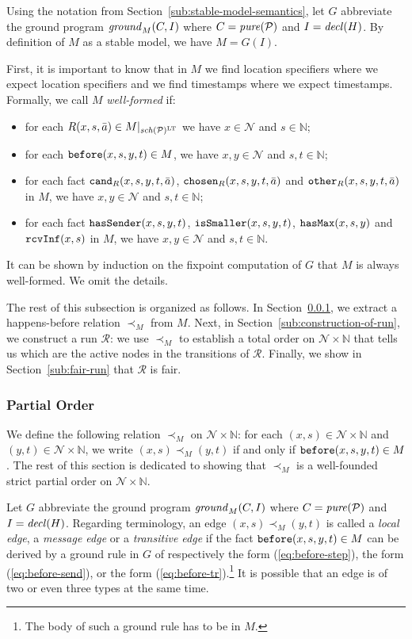 \documentclass{tlp}
\newcommand{\Nat}{\mathbb{N}}  \newcommand{\len}[1]{|#1|} \newcommand{\rom}[1]{\text{\emph{(#1)}}} \newcommand{\romI}{\rom i}
\newcommand{\ded}{\mathcal{P}}
\newcommand{\proj}[2]{#1|_{#2}}
\newcommand{\schof}[1]{\fname{sch}(#1)}
\newcommand{\grp}[3]{\fname{ground}_{#1}(#2,#3)}
\newcommand{\nw}{\mathcal{N}}
\newcommand{\toloct}[1]{#1^{\mathrm{LT}}}
\newcommand{\before}{\pred{before}}
\newcommand{\chosen}{\pred{chosen}}
\newcommand{\other}{\pred{other}}
\newcommand{\cand}{\pred{cand}}
\newcommand{\rcvinf}{\pred{rcvInf}}
\newcommand{\issmaller}{\pred{isSmaller}}
\newcommand{\hasmax}{\pred{hasMax}}
\newcommand{\hassender}{\pred{hasSender}}
\newcommand{\decl}[1]{\fname{decl}(#1)}
\newcommand{\pure}[1]{\fname{pure}(#1)}
\newcommand{\run}{\mathcal{R}}
\newcommand{\nwnat}{\nw\times\Nat}
\newcommand{\grded}{G}
\newcommand{\cauM}{\prec_{M}}
\begin{document}
Using the notation from Section~\ref{sub:stable-model-semantics},
let $\grded$ abbreviate the ground program $\grp MCI$ where $C=\pure{\ded}$
and $I=\decl H$. By definition of $M$ as a stable model, we have
$M=\grded(I)$. 

First, it is important to know that in $M$ we find location specifiers
where we expect location specifiers and we find timestamps where we
expect timestamps. Formally, we call $M$ \emph{well-formed} if:
\begin{itemize}
\item for each $R(x,s,\bar{a})\in\proj M{\toloct{\schof{\ded}}}$ we have
$x\in\nw$ and $s\in\Nat$;
\item for each $\before(x,s,y,t)\in M$, we have $x,y\in\nw$ and $s,t\in\Nat$;
\item for each fact $\cand_{R}(x,s,y,t,\bar{a})$, $\chosen_{R}(x,s,y,t,\bar{a})$
and $\other_{R}(x,s,y,t,\bar{a})$ in $M$, we have $x,y\in\nw$ and
$s,t\in\Nat$;
\item for each fact $\hassender(x,s,y,t)$, $\issmaller(x,s,y,t)$, $\hasmax(x,s,y)$
and $\rcvinf(x,s)$ in $M$, we have $x,y\in\nw$ and $s,t\in\Nat$.
\end{itemize}
It can be shown by induction on the fixpoint computation of $\grded$
that $M$ is always well-formed. We omit the details.

The rest of this subsection is organized as follows. In Section~\ref{sub:partial-order-M},
we extract a happens-before relation $\cauM$ from $M$. Next, in
Section~\ref{sub:construction-of-run}, we construct a run $\run$:
we use $\cauM$ to establish a total order on $\nwnat$ that tells
us which are the active nodes in the transitions of $\run$. Finally,
we show in Section~\ref{sub:fair-run} that $\run$ is fair.


\subsubsection{Partial Order}

\label{sub:partial-order-M}

\newcommand{\cauMx}[1]{\prec_{M}^{#1}}


We define the following relation $\cauM$ on $\nwnat$: for each $(x,s)\in\nwnat$
and $(y,t)\in\nwnat$, we write $(x,s)\cauM(y,t)$ if and only if
$\before(x,s,y,t)\in M$. The rest of this section is dedicated to
showing that $\cauM$ is a well-founded strict partial order on $\nwnat$.

Let $\grded$ abbreviate the ground program $\grp MCI$ where $C=\pure{\ded}$
and $I=\decl H$. Regarding terminology, an edge $(x,s)\cauM(y,t)$
is called a \emph{local edge}, a \emph{message edge} or a \emph{transitive
edge} if the fact $\before(x,s,y,t)\in M$ can be derived by a ground
rule in $\grded$ of respectively the form (\ref{eq:before-step}),
the form (\ref{eq:before-send}), or the form (\ref{eq:before-tr}).\footnote{The body of such a ground rule has to be in $M$.}  It is possible that an edge is of two or even three types at the
same time.
\end{document}
